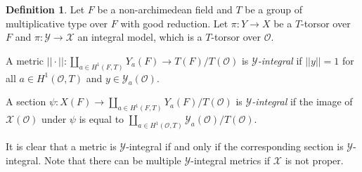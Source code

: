 \documentclass[a4paper,11pt,reqno]{amsart}
\theoremstyle{definition}
\newtheorem{definition}[theorem]{Definition}
\begin{document}
\begin{definition}
	Let $F$ be a non-archimedean field and $T$ be a group of multiplicative type over $F$ with good reduction. Let $\pi: Y \to X$ be a $T$-torsor over $F$ and $\pi: \mathcal{Y} \to \mathcal{X}$ an integral model, which is a $T$-torsor over $\mathcal{O}$.
	
	 A metric $||\cdot||: \coprod_{a \in H^1(F, T)} Y_{a}(F) \to T(F)/T(\mathcal{O})$ is \emph{$\mathcal{Y}$-integral} if $||y|| = 1$ for all $a \in H^1(\mathcal{O}, T)$ and $y \in \mathcal{Y}_{a}(\mathcal{O})$.
	 
	 A section $\psi: X(F) \to \coprod_{a \in H^1(F, T)} Y_{a}(F)/T(\mathcal{O})$ is \emph{$\mathcal{Y}$-integral} if the image of $\mathcal{X}(\mathcal{O})$ under $\psi$ is equal to $\coprod_{a \in H^1(\mathcal{O}, T)} \mathcal{Y}_{a}(\mathcal{O})/ T(\mathcal{O})$.
\end{definition}
It is clear that a metric is $\mathcal{Y}$-integral if and only if the corresponding section is $\mathcal{Y}$-integral. Note that there can be multiple $\mathcal{Y}$-integral metrics if $\mathcal{X}$ is not proper.
\end{document}
